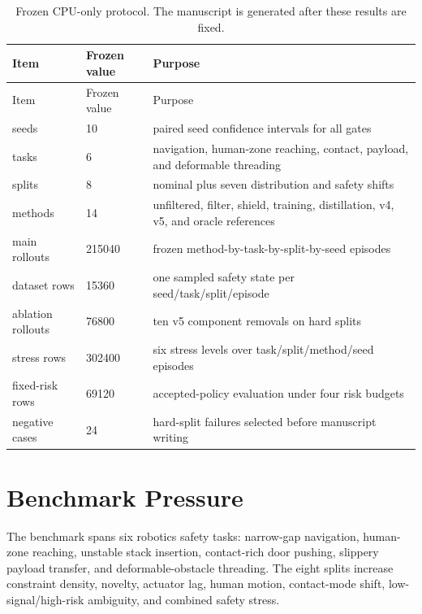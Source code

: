 \documentclass{article}
\begin{document}
\begingroup
\scriptsize
\begin{longtable}{@{}lll@{}}
\caption{Frozen CPU-only protocol. The manuscript is generated after these results are fixed.}\\
\toprule
Item & Frozen value & Purpose \\
\midrule
\endfirsthead
\toprule
Item & Frozen value & Purpose \\
\midrule
\endhead
seeds & 10 & paired seed confidence intervals for all gates \\
tasks & 6 & navigation, human-zone reaching, contact, payload, and deformable threading \\
splits & 8 & nominal plus seven distribution and safety shifts \\
methods & 14 & unfiltered, filter, shield, training, distillation, v4, v5, and oracle references \\
main rollouts & 215040 & frozen method-by-task-by-split-by-seed episodes \\
dataset rows & 15360 & one sampled safety state per seed/task/split/episode \\
ablation rollouts & 76800 & ten v5 component removals on hard splits \\
stress rows & 302400 & six stress levels over task/split/method/seed episodes \\
fixed-risk rows & 69120 & accepted-policy evaluation under four risk budgets \\
negative cases & 24 & hard-split failures selected before manuscript writing \\
\bottomrule
\end{longtable}
\endgroup


\section{Benchmark Pressure}
The benchmark spans six robotics safety tasks: narrow-gap navigation, human-zone reaching, unstable stack insertion, contact-rich door pushing, slippery payload transfer, and deformable-obstacle threading. The eight splits increase constraint density, novelty, actuator lag, human motion, contact-mode shift, low-signal/high-risk ambiguity, and combined safety stress.
\end{document}
